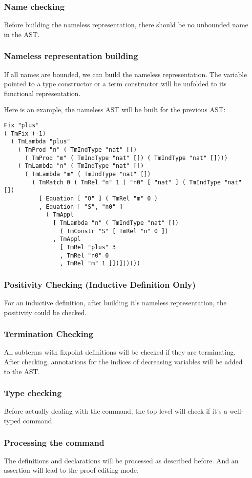 \subsubsection*{Name checking}
Before building the nameless representation, there should be no unbounded name in the AST.
\subsubsection*{Nameless representation building}
If all names are bounded, we can build the nameless representation. The variable pointed to
a type constructor or a term constructor will be unfolded to its functional representation.

Here is an example, the nameless AST will be built for the previous AST:
\begin{center}
\begin{minipage}{0.9\textwidth}
\begin{verbatim}
Fix "plus"
( TmFix (-1)
  ( TmLambda "plus"
    ( TmProd "n" ( TmIndType "nat" [])
      ( TmProd "m" ( TmIndType "nat" []) ( TmIndType "nat" [])))
    ( TmLambda "n" ( TmIndType "nat" [])
      ( TmLambda "m" ( TmIndType "nat" [])
        ( TmMatch 0 ( TmRel "n" 1 ) "n0" [ "nat" ] ( TmIndType "nat" [])
          [ Equation [ "O" ] ( TmRel "m" 0 )
          , Equation [ "S", "n0" ]
            ( TmAppl 
              [ TmLambda "n" ( TmIndType "nat" [])
                ( TmConstr "S" [ TmRel "n" 0 ])
              , TmAppl
                [ TmRel "plus" 3
                , TmRel "n0" 0
                , TmRel "m" 1 ]])])))))
\end{verbatim}
\end{minipage}
\end{center}
\subsubsection*{Positivity Checking (Inductive Definition Only)}
For an inductive definition, after building it's nameless representation, the positivity
could be checked.
\subsubsection*{Termination Checking}
All subterms with fixpoint definitions will be checked if they are terminating. After checking,
annotations for the indices of decreasing variables will be added to the AST.
\subsubsection*{Type checking}
Before actually dealing with the command, the top level will check if it's a well-typed command.
\subsubsection*{Processing the command}
The definitions and declarations will be processed as described before. And an assertion will lead to the proof editing mode.

